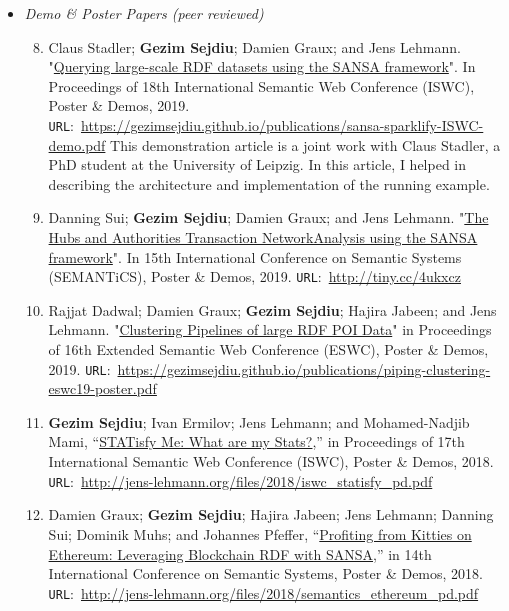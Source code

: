 \begin{itemize}
\begin{enumerate}
\end{enumerate}
    \item \emph{Demo \& Poster Papers (peer reviewed)}
    \begin{enumerate}
    \setcounter{enumi}{7}

    \item Claus Stadler; \textbf{Gezim Sejdiu}; Damien Graux; and Jens Lehmann. "\href{https://gezimsejdiu.github.io/publications/sansa-sparklify-ISWC-demo.pdf}{Querying large-scale RDF datasets using the SANSA framework}".  In Proceedings of 18th International Semantic Web Conference (ISWC), Poster \& Demos, 2019. \texttt{URL}:~\url{https://gezimsejdiu.github.io/publications/sansa-sparklify-ISWC-demo.pdf}
    This demonstration article is a joint work with Claus Stadler, a PhD student at the University of Leipzig.
    In this article, I helped in describing the architecture and implementation of the running example.

    \item Danning Sui; \textbf{Gezim Sejdiu}; Damien Graux; and Jens Lehmann. "\href{https://gezimsejdiu.github.io/publications/sansa-hubs-and-authorities-transaction-semantics19-poster.pdf}{The Hubs and Authorities Transaction NetworkAnalysis using the SANSA framework}".  In 15th International Conference on Semantic Systems (SEMANTiCS), Poster \& Demos, 2019. \texttt{URL}:~\url{http://tiny.cc/4ukxcz}
    
    \item Rajjat Dadwal; Damien Graux; \textbf{Gezim Sejdiu}; Hajira Jabeen; and Jens Lehmann. "\href{https://gezimsejdiu.github.io/publications/piping-clustering-eswc19-poster.pdf}{Clustering Pipelines of large RDF POI Data}" in Proceedings of 16th Extended Semantic Web Conference (ESWC), Poster \& Demos, 2019. \texttt{URL}:~\url{https://gezimsejdiu.github.io/publications/piping-clustering-eswc19-poster.pdf}
    
    \item \textbf{Gezim Sejdiu}; Ivan Ermilov; Jens Lehmann; and Mohamed-Nadjib Mami, “\href{http://jens-lehmann.org/files/2018/iswc_statisfy_pd.pdf}{STATisfy Me: What are my Stats?},” in Proceedings of 17th International Semantic Web Conference (ISWC), Poster \& Demos, 2018. \texttt{URL}:~\url{http://jens-lehmann.org/files/2018/iswc_statisfy_pd.pdf}
    
    \item Damien Graux; \textbf{Gezim Sejdiu}; Hajira Jabeen; Jens Lehmann; Danning Sui; Dominik Muhs; and Johannes Pfeffer, “\href{http://jens-lehmann.org/files/2018/semantics_ethereum_pd.pdf}{Profiting from Kitties on Ethereum: Leveraging Blockchain RDF with SANSA},” in 14th International Conference on Semantic Systems, Poster \& Demos, 2018. \texttt{URL}:~\url{http://jens-lehmann.org/files/2018/semantics_ethereum_pd.pdf}
    

\end{enumerate}
\end{itemize}
